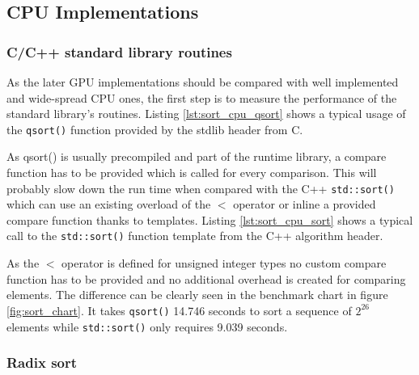 \subsection{CPU Implementations}

\subsubsection{C/C++ standard library routines}

As the later GPU implementations should be compared with well implemented and wide-spread CPU ones, the first step is to measure the performance of the standard library's routines.
Listing \ref{lst:sort_cpu_qsort} shows a typical usage of the \lstinline|qsort()| function provided by the stdlib header from C.



As qsort() is usually precompiled and part of the runtime library, a compare function has to be provided which is called for every comparison. This will probably slow down the run time when compared with the C++ \lstinline!std::sort()! which can use an existing overload of the $<$ operator or inline a provided compare function thanks to templates.
Listing \ref{lst:sort_cpu_sort} shows a typical call to the \lstinline!std::sort()! function template from the C++ algorithm header.



As the $<$ operator is defined for unsigned integer types no custom compare function has to be provided and no additional overhead is created for comparing elements.
The difference can be clearly seen in the benchmark chart in figure \ref{fig:sort_chart}. It takes \lstinline!qsort()! 14.746 seconds to sort a sequence of $2^{26}$ elements while \lstinline!std::sort()! only requires 9.039 seconds.

\subsubsection{Radix sort}
\label{sec:sorting_radix_cpu}

